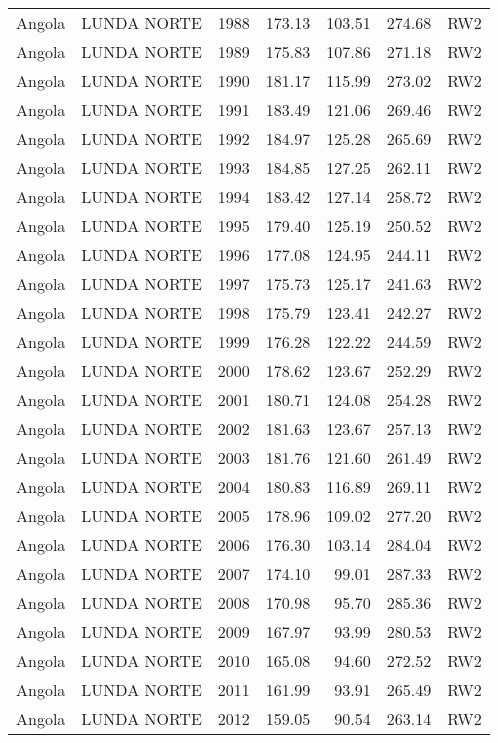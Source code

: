 \begin{longtable}{lllrrrl}
  Angola & LUNDA NORTE & 1988 & 173.13 & 103.51 & 274.68 & RW2 \\ 
  Angola & LUNDA NORTE & 1989 & 175.83 & 107.86 & 271.18 & RW2 \\ 
  Angola & LUNDA NORTE & 1990 & 181.17 & 115.99 & 273.02 & RW2 \\ 
  Angola & LUNDA NORTE & 1991 & 183.49 & 121.06 & 269.46 & RW2 \\ 
  Angola & LUNDA NORTE & 1992 & 184.97 & 125.28 & 265.69 & RW2 \\ 
  Angola & LUNDA NORTE & 1993 & 184.85 & 127.25 & 262.11 & RW2 \\ 
  Angola & LUNDA NORTE & 1994 & 183.42 & 127.14 & 258.72 & RW2 \\ 
  Angola & LUNDA NORTE & 1995 & 179.40 & 125.19 & 250.52 & RW2 \\ 
  Angola & LUNDA NORTE & 1996 & 177.08 & 124.95 & 244.11 & RW2 \\ 
  Angola & LUNDA NORTE & 1997 & 175.73 & 125.17 & 241.63 & RW2 \\ 
  Angola & LUNDA NORTE & 1998 & 175.79 & 123.41 & 242.27 & RW2 \\ 
  Angola & LUNDA NORTE & 1999 & 176.28 & 122.22 & 244.59 & RW2 \\ 
  Angola & LUNDA NORTE & 2000 & 178.62 & 123.67 & 252.29 & RW2 \\ 
  Angola & LUNDA NORTE & 2001 & 180.71 & 124.08 & 254.28 & RW2 \\ 
  Angola & LUNDA NORTE & 2002 & 181.63 & 123.67 & 257.13 & RW2 \\ 
  Angola & LUNDA NORTE & 2003 & 181.76 & 121.60 & 261.49 & RW2 \\ 
  Angola & LUNDA NORTE & 2004 & 180.83 & 116.89 & 269.11 & RW2 \\ 
  Angola & LUNDA NORTE & 2005 & 178.96 & 109.02 & 277.20 & RW2 \\ 
  Angola & LUNDA NORTE & 2006 & 176.30 & 103.14 & 284.04 & RW2 \\ 
  Angola & LUNDA NORTE & 2007 & 174.10 & 99.01 & 287.33 & RW2 \\ 
  Angola & LUNDA NORTE & 2008 & 170.98 & 95.70 & 285.36 & RW2 \\ 
  Angola & LUNDA NORTE & 2009 & 167.97 & 93.99 & 280.53 & RW2 \\ 
  Angola & LUNDA NORTE & 2010 & 165.08 & 94.60 & 272.52 & RW2 \\ 
  Angola & LUNDA NORTE & 2011 & 161.99 & 93.91 & 265.49 & RW2 \\ 
  Angola & LUNDA NORTE & 2012 & 159.05 & 90.54 & 263.14 & RW2 \\ 

\end{longtable}
